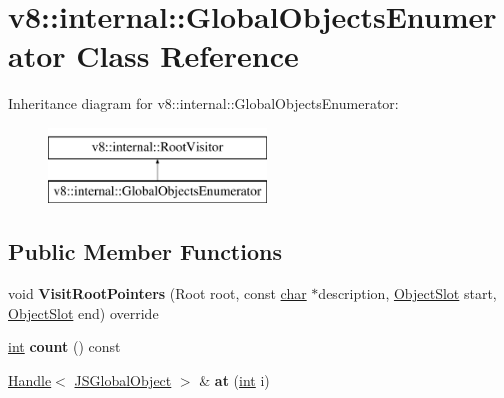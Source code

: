 \hypertarget{classv8_1_1internal_1_1GlobalObjectsEnumerator}{}\section{v8\+:\+:internal\+:\+:Global\+Objects\+Enumerator Class Reference}
\label{classv8_1_1internal_1_1GlobalObjectsEnumerator}
Inheritance diagram for v8\+:\+:internal\+:\+:Global\+Objects\+Enumerator\+:\begin{figure}[H]
\begin{center}
\leavevmode
\includegraphics[height=2.000000cm]{classv8_1_1internal_1_1GlobalObjectsEnumerator}
\end{center}
\end{figure}
\subsection*{Public Member Functions}
\begin{DoxyCompactItemize}
\item 
\mbox{\label{classv8_1_1internal_1_1GlobalObjectsEnumerator_a65b8a7fd2651720cdeff54104963b06d}} 
void {\bfseries Visit\+Root\+Pointers} (Root root, const \mbox{\hyperlink{classchar}{char}} $\ast$description, \mbox{\hyperlink{classv8_1_1internal_1_1ObjectSlot}{Object\+Slot}} start, \mbox{\hyperlink{classv8_1_1internal_1_1ObjectSlot}{Object\+Slot}} end) override
\item 
\mbox{\label{classv8_1_1internal_1_1GlobalObjectsEnumerator_a3a8fb1ebf908b0e38fa1310168cab120}} 
\mbox{\hyperlink{classint}{int}} {\bfseries count} () const
\item 
\mbox{\label{classv8_1_1internal_1_1GlobalObjectsEnumerator_a5f6c11e23a0d9d4abe83af8b9abc2ec1}} 
\mbox{\hyperlink{classv8_1_1internal_1_1Handle}{Handle}}$<$ \mbox{\hyperlink{classv8_1_1internal_1_1JSGlobalObject}{J\+S\+Global\+Object}} $>$ \& {\bfseries at} (\mbox{\hyperlink{classint}{int}} i)
\end{DoxyCompactItemize}
